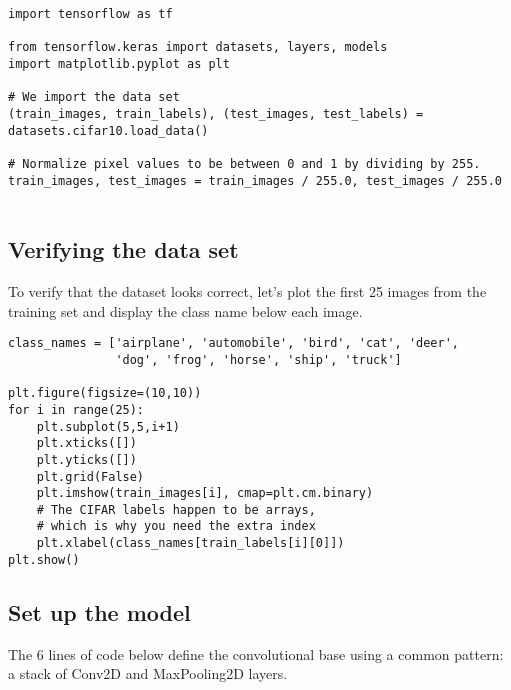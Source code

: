\documentclass[%
oneside,                 %
final,                   %
10pt]{article}
\begin{document}
\begin{verbatim}
import tensorflow as tf

from tensorflow.keras import datasets, layers, models
import matplotlib.pyplot as plt

# We import the data set
(train_images, train_labels), (test_images, test_labels) = datasets.cifar10.load_data()

# Normalize pixel values to be between 0 and 1 by dividing by 255. 
train_images, test_images = train_images / 255.0, test_images / 255.0


\end{verbatim}


\subsection*{Verifying the data set}

To verify that the dataset looks correct, let's plot the first 25 images from the training set and display the class name below each image.
















\begin{verbatim}
class_names = ['airplane', 'automobile', 'bird', 'cat', 'deer',
               'dog', 'frog', 'horse', 'ship', 'truck']
​
plt.figure(figsize=(10,10))
for i in range(25):
    plt.subplot(5,5,i+1)
    plt.xticks([])
    plt.yticks([])
    plt.grid(False)
    plt.imshow(train_images[i], cmap=plt.cm.binary)
    # The CIFAR labels happen to be arrays, 
    # which is why you need the extra index
    plt.xlabel(class_names[train_labels[i][0]])
plt.show()

\end{verbatim}


\subsection*{Set up  the model}

The 6 lines of code below define the convolutional base using a common pattern: a stack of Conv2D and MaxPooling2D layers.
\end{document}
